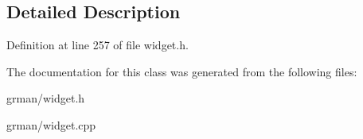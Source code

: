 \subsection{Detailed Description}


Definition at line 257 of file widget.\+h.



The documentation for this class was generated from the following files\+:\begin{DoxyCompactItemize}
\item 
grman/widget.\+h\item 
grman/widget.\+cpp\end{DoxyCompactItemize}
